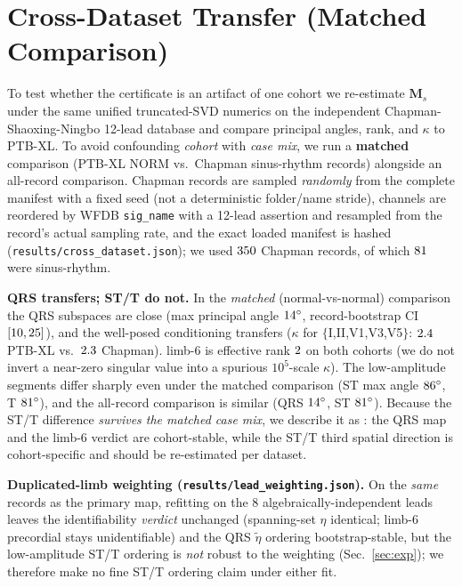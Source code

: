 \section{Cross-Dataset Transfer (Matched Comparison)}
\label{sec:cross}
To test whether the certificate is an artifact of one cohort we re-estimate $\bm M_s$ under the
same unified truncated-SVD numerics on the independent Chapman-Shaoxing-Ningbo 12-lead database
\cite{zheng2020chapman} and compare principal angles, rank, and $\kappa$ to PTB-XL. To avoid
confounding \emph{cohort} with \emph{case mix}, we run a \textbf{matched} comparison (PTB-XL NORM
vs.\ Chapman sinus-rhythm records) alongside an all-record comparison. Chapman records are sampled
\emph{randomly} from the complete manifest with a fixed seed (not a deterministic folder/name
stride), channels are reordered by WFDB \texttt{sig\_name} with a 12-lead assertion and resampled
from the record's actual sampling rate, and the exact loaded manifest is hashed
(\texttt{results/cross\_dataset.json}); we used $350$ Chapman records, of which
$81$ were sinus-rhythm.

\textbf{QRS transfers; ST/T do not.} In the \emph{matched} (normal-vs-normal) comparison the QRS
subspaces are close (max principal angle $14^\circ$, record-bootstrap CI
$[10,25]$), and the well-posed conditioning transfers ($\kappa$ for $\{$I,II,V1,V3,V5$\}$:
$2.4$ PTB-XL vs.\ $2.3$ Chapman). limb-6 is effective rank
$2$ on both cohorts (we do not invert a near-zero singular value into a
spurious $10^5$-scale $\kappa$). The low-amplitude segments differ sharply even under the matched
comparison (ST max angle $86^\circ$, T $81^\circ$), and the all-record
comparison is similar (QRS $14^\circ$, ST $81^\circ$). Because the ST/T
difference \emph{survives the matched case mix}, we describe it as \CrossVerdict: the QRS map and
the limb-6 verdict are cohort-stable, while the ST/T third spatial direction is cohort-specific
and should be re-estimated per dataset.

\textbf{Duplicated-limb weighting (\texttt{results/lead\_weighting.json}).} On the \emph{same}
records as the primary map, refitting on the 8 algebraically-independent leads leaves the
identifiability \emph{verdict} unchanged (spanning-set $\eta$ identical; limb-6 precordial stays
unidentifiable) and the QRS $\tilde\eta$ ordering bootstrap-stable, but the low-amplitude ST/T
ordering is \emph{not} robust to the weighting (Sec.~\ref{sec:exp}); we therefore make no fine
ST/T ordering claim under either fit.